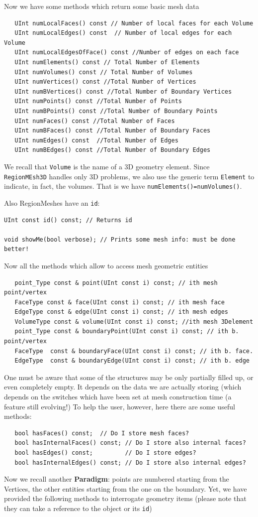 Now we have some methods which return some basic mesh data
\begin{verbatim}
   UInt numLocalFaces() const // Number of local faces for each Volume
   UInt numLocalEdges() const  // Number of local edges for each Volume
   UInt numLocalEdgesOfFace() const //Number of edges on each face
   UInt numElements() const // Total Number of Elements
   UInt numVolumes() const // Total Number of Volumes
   UInt numVertices() const //Total Number of Vertices
   UInt numBVertices() const //Total Number of Boundary Vertices
   UInt numPoints() const //Total Number of Points
   UInt numBPoints() const //Total Number of Boundary Points
   UInt numFaces() const //Total Number of Faces
   UInt numBFaces() const //Total Number of Boundary Faces
   UInt numEdges() const  //Total Number of Edges
   UInt numBEdges() const //Total Number of Boundary Edges
\end{verbatim}
We recall that \texttt{Volume} is the name of a 3D geometry element.
Since \texttt{RegionMEsh3D} handles only 3D problems, we also use the
generic term \texttt{Element} to indicate, in fact, the volumes. That
is we have \texttt{numElements()=numVolumes()}.

Also RegionMeshes have an \texttt{id}:
\begin{verbatim}
UInt const id() const; // Returns id

void showMe(bool verbose); // Prints some mesh info: must be done better!
\end{verbatim}
Now all the methods which allow to access mesh geometric entities
\begin{verbatim}
   point_Type const & point(UInt const i) const; // ith mesh point/vertex
   FaceType const & face(UInt const i) const; // ith mesh face 
   EdgeType const & edge(UInt const i) const; // ith mesh edges  
   VolumeType const & volume(UInt const i) const; //ith mesh 3Delement
   point_Type const & boundaryPoint(UInt const i) const; // ith b. point/vertex
   FaceType  const & boundaryFace(UInt const i) const; // ith b. face.
   EdgeType  const & boundaryEdge(UInt const i) const; // ith b. edge
\end{verbatim}
One must be aware that some of the structures may be only partially
filled up, or even completely empty. It depends on the data we are
actually storing (which depends on the switches which have been set at
mesh construction time (a feature still evolving!)
To help the user, however, here there are some useful methods:
\begin{verbatim}
   bool hasFaces() const;  // Do I store mesh faces?
   bool hasInternalFaces() const; // Do I store also internal faces?
   bool hasEdges() const;         // Do I store edges?
   bool hasInternalEdges() const; // Do I store also internal edges?
\end{verbatim}
Now we recall another \textbf{Paradigm}: points are numbered starting
from the Vertices, the other entities starting from the one on the
boundary.  Yet, we have provided the following methods to interrogate
geometry items (please note that they can take a reference to the
object or its \texttt{id})

